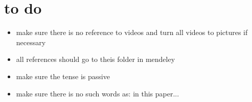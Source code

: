 \chapter{to do}
\begin{itemize}
	\item make sure there is no reference to videos and turn all videos to pictures if necessary
	\item all references should go to theis folder in mendeley
	\item make sure the tense is passive
	\item make sure there is no such words as: in this paper...
\end{itemize}
